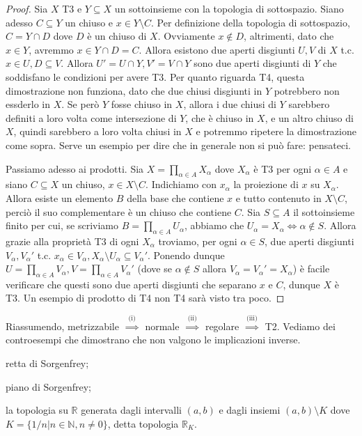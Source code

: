 \begin{proof}
  Sia $X$ T3 e $Y \subseteq X$ un sottoinsieme con la topologia di sottospazio. Siano adesso $C \subseteq Y$ un chiuso e $x \in Y \setminus C$. Per definizione della topologia di sottospazio, $C=Y \cap D$ dove $D$ è un chiuso di $X$. Ovviamente $x \not\in D$, altrimenti, dato che $x \in Y$, avremmo $x \in Y \cap D=C$. Allora esistono due aperti disgiunti $U, V$ di $X$ t.c. $x \in U, D \subseteq V$. Allora $U'=U \cap Y, V'=V \cap Y$ sono due aperti
  disgiunti di $Y$ che soddisfano le condizioni per avere T3. Per quanto riguarda T4, questa dimostrazione non funziona, dato che due chiusi disgiunti in $Y$ potrebbero non essderlo in $X$. Se però $Y$ fosse chiuso in $X$, allora i due chiusi di $Y$ sarebbero definiti a loro volta come intersezione di $Y$, che è chiuso in $X$, e un altro chiuso di $X$, quindi sarebbero a loro volta chiusi in $X$ e potremmo ripetere la dimostrazione come sopra. Serve un esempio per dire che in generale non si può fare: pensateci.

  Passiamo adesso ai prodotti. Sia $\displaystyle X=\prod_{\alpha \in A} X_{\alpha}$ dove $X_{\alpha}$ è T3 per ogni $\alpha \in A$ e siano $C \subseteq X$ un chiuso, $x \in X \setminus C$. Indichiamo con $x_{\alpha}$ la proiezione di $x$ su $X_{\alpha}$. Allora esiste un elemento $B$ della base che contiene $x$ e tutto contenuto in $X \setminus C$, perciò il suo complementare è un chiuso che contiene $C$. Sia $S \subseteq A$ il
  sottoinsieme finito per cui, se scriviamo $\displaystyle B=\prod_{\alpha \in A} U_{\alpha}$, abbiamo che $U_{\alpha}=X_{\alpha} \Leftrightarrow \alpha \not\in S$. Allora grazie alla proprietà T3 di ogni $X_{\alpha}$ troviamo, per ogni $\alpha \in S$, due aperti disgiunti $V_{\alpha}, V_{\alpha}'$  t.c.
  $x_{\alpha} \in V_{\alpha}, X_{\alpha} \setminus U_{\alpha} \subseteq V_{\alpha }'$. Ponendo dunque $\displaystyle U=\prod_{\alpha \in A} V_{\alpha}, V=\prod_{\alpha \in A} V_{\alpha}'$ (dove se $\alpha \not\in S$
  allora $V_{\alpha}=V_{\alpha}'=X_{\alpha}$) è facile verificare che questi sono due aperti disgiunti che separano $x$ e $C$, dunque $X$ è T3. Un esempio di prodotto di T4 non T4 sarà visto tra poco.
\end{proof}

Riassumendo, metrizzabile $\stackrel{\text{(i)}}{\implies}$ normale $\stackrel{\text{(ii)}}{\implies}$ regolare $\stackrel{\text{(iii)}}{\implies}$ T2. Vediamo dei controesempi che dimostrano che non valgono le implicazioni inverse.

\begin{ex}
  \begin{nlist}
    \item retta di Sorgenfrey;
    \item piano di Sorgenfrey;
    \item la topologia su $\mathbb{R}$ generata dagli intervalli $(a, b)$ e dagli insiemi $(a, b) \setminus K$ dove $K= \{ 1/n | n \in \mathbb{N}, n \not=0 \}$, detta topologia $\mathbb{R}_K$.
\end{nlist}
\end{ex}

